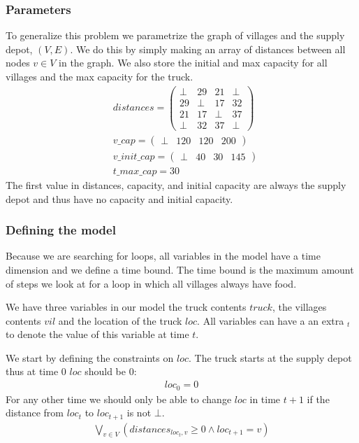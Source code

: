 \documentclass[12pt]{scrartcl}
\begin{document}
\subsubsection{Parameters}
To generalize this problem we parametrize the graph of villages and the supply depot, $(V,E)$. We do this by simply making an array of distances between all nodes $v\in V$ in the graph. We also store the initial and max capacity for all villages and the max capacity for the truck.
\begin{align*}
    &distances = \left(
        \begin{array}{llll}
            \bot & 29& 21& \bot \\
            29& \bot & 17& 32 \\
            21& 17& \bot & 37 \\
            \bot & 32& 37& \bot 
        \end{array}
    \right) \\
    &v\_cap = \left(
        \begin{array}{llll}
            \bot& 120& 120& 200
        \end{array}
    \right) \\
    &v\_init\_cap = \left(
        \begin{array}{llll}
            \bot& 40& 30& 145
        \end{array}
    \right)\\
    &t\_max\_cap = 30
\end{align*}
The first value in distances, capacity, and initial capacity are always the supply depot and thus have no capacity and initial capacity.

\subsubsection{Defining the model}
Because we are searching for loops, all variables in the model have a time dimension and we define a time bound. The time bound is the maximum amount of steps we look at for a loop in which all villages always have food. 

We have three variables in our model the truck contents $truck$, the villages contents $vil$ and the location of the truck $loc$. All variables can have a an extra $_t$ to denote the value of this variable at time $t$.

We start by defining the constraints on $loc$. The truck starts at the supply depot thus at time 0 $loc$ should be 0:
\begin{align*}
    loc_0 = 0
\end{align*}
For any other time we should only be able to change $loc$ in time $t+1$ if the distance from $loc_t$ to $loc_{t+1}$ is not $\bot$.
\begin{align*}
    \bigvee_{v\in V}\left(distances_{loc_t, v} \geq 0 \wedge loc_{t+1} = v \right)
\end{align*}
\end{document}
